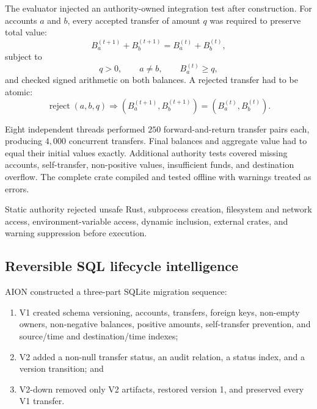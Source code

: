 The evaluator injected an authority-owned integration test after construction.
For accounts $a$ and $b$, every accepted transfer of amount $q$ was required to
preserve total value:
\begin{equation}
B_a^{(t+1)} + B_b^{(t+1)}
= B_a^{(t)} + B_b^{(t)},
\label{eq:ledger-conservation}
\end{equation}
subject to
\begin{equation}
q > 0, \qquad a \neq b, \qquad B_a^{(t)} \geq q,
\label{eq:ledger-preconditions}
\end{equation}
and checked signed arithmetic on both balances.  A rejected transfer had to be
atomic:
\begin{equation}
\operatorname{reject}(a,b,q)
\Longrightarrow
\left(B_a^{(t+1)},B_b^{(t+1)}\right)
=\left(B_a^{(t)},B_b^{(t)}\right).
\label{eq:ledger-rollback}
\end{equation}

Eight independent threads performed $250$ forward-and-return transfer pairs
each, producing $4{,}000$ concurrent transfers.  Final balances and aggregate
value had to equal their initial values exactly.  Additional authority tests
covered missing accounts, self-transfer, non-positive values, insufficient
funds, and destination overflow.  The complete crate compiled and tested
offline with warnings treated as errors.

Static authority rejected unsafe Rust, subprocess creation, filesystem and
network access, environment-variable access, dynamic inclusion, external
crates, and warning suppression before execution.


\subsection{Reversible SQL lifecycle intelligence}
\label{subsec:sql-lifecycle-depth}

AION constructed a three-part SQLite migration sequence:
\begin{enumerate}
  \item V1 created schema versioning, accounts, transfers, foreign keys,
        non-empty owners, non-negative balances, positive amounts,
        self-transfer prevention, and source/time and destination/time indexes;
  \item V2 added a non-null transfer status, an audit relation, a status index,
        and a version transition; and
  \item V2-down removed only V2 artifacts, restored version 1, and preserved
        every V1 transfer.
\end{enumerate}

